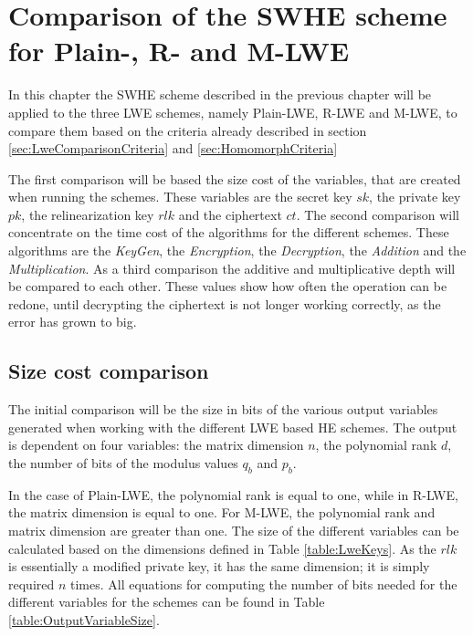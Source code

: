 \chapter{Comparison of the SWHE scheme for Plain-, R- and M-LWE}

In this chapter the SWHE scheme described in the previous chapter will be applied to the three LWE schemes, namely Plain-LWE, R-LWE and M-LWE, to compare them based on the criteria already described in section \ref{sec:LweComparisonCriteria} and \ref{sec:HomomorphCriteria}

The first comparison will be based the size cost of the variables, that are created when running the schemes. These variables are the secret key $sk$, the private key $pk$, the relinearization key $rlk$ and the ciphertext $ct$. The second comparison will concentrate on the time cost of the algorithms for the different schemes. These algorithms are the \textit{KeyGen}, the \textit{Encryption}, the \textit{Decryption}, the \textit{Addition} and the \textit{Multiplication}. As a third comparison the additive and multiplicative depth will be compared to each other. These values show how often the operation can be redone, until decrypting the ciphertext is not longer working correctly, as the error has grown to big.

\section{Size cost comparison}

The initial comparison will be the size in bits of the various output variables generated when working with the different LWE based HE schemes. The output is dependent on four variables: the matrix dimension $n$, the polynomial rank $d$, the number of bits of the modulus values $q_b$ and $p_b$.

In the case of Plain-LWE, the polynomial rank is equal to one, while in R-LWE, the matrix dimension is equal to one. For M-LWE, the polynomial rank and matrix dimension are greater than one. The size of the different variables can be calculated based on the dimensions defined in Table \ref{table:LweKeys}. As the $rlk$ is essentially a modified private key, it has the same dimension; it is simply required $n$ times. All equations for computing the number of bits needed for the different variables for the schemes can be found in Table \ref{table:OutputVariableSize}. 


